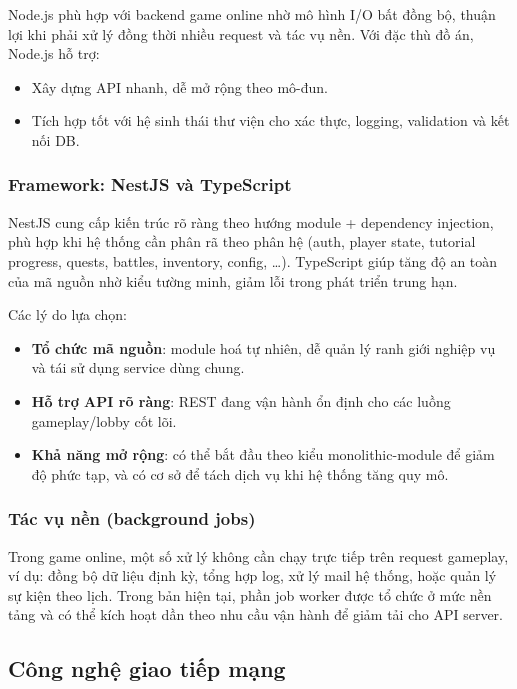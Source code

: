 Node.js phù hợp với backend game online nhờ mô hình I/\allowbreak O bất đồng bộ, thuận lợi khi phải xử lý đồng thời nhiều request và tác vụ nền\cite{nodejs-docs}. Với đặc thù đồ án, Node.js hỗ trợ:
\begin{itemize}
    \item Xây dựng API nhanh, dễ mở rộng theo mô-đun.
    \item Tích hợp tốt với hệ sinh thái thư viện cho xác thực, logging, validation và kết nối DB.
\end{itemize}

\subsubsection{Framework: NestJS và TypeScript}

NestJS cung cấp kiến trúc rõ ràng theo hướng module + dependency injection, phù hợp khi hệ thống cần phân rã theo phân hệ (auth, player state, tutorial progress, quests, battles, inventory, config, \ldots)\cite{nest-docs}. TypeScript giúp tăng độ an toàn của mã nguồn nhờ kiểu tường minh, giảm lỗi trong phát triển trung hạn.

Các lý do lựa chọn:
\begin{itemize}
    \item \textbf{Tổ chức mã nguồn}: module hoá tự nhiên, dễ quản lý ranh giới nghiệp vụ và tái sử dụng service dùng chung.
    \item \textbf{Hỗ trợ API rõ ràng}: REST đang vận hành ổn định cho các luồng gameplay/lobby cốt lõi\cite{nest-docs}.
    \item \textbf{Khả năng mở rộng}: có thể bắt đầu theo kiểu monolithic-module để giảm độ phức tạp, và có cơ sở để tách dịch vụ khi hệ thống tăng quy mô.
\end{itemize}

\subsubsection{Tác vụ nền (background jobs)}

Trong game online, một số xử lý không cần chạy trực tiếp trên request gameplay, ví dụ: đồng bộ dữ liệu định kỳ, tổng hợp log, xử lý mail hệ thống, hoặc quản lý sự kiện theo lịch. Trong bản hiện tại, phần job worker được tổ chức ở mức nền tảng và có thể kích hoạt dần theo nhu cầu vận hành để giảm tải cho API server.

\subsection{Công nghệ giao tiếp mạng}

